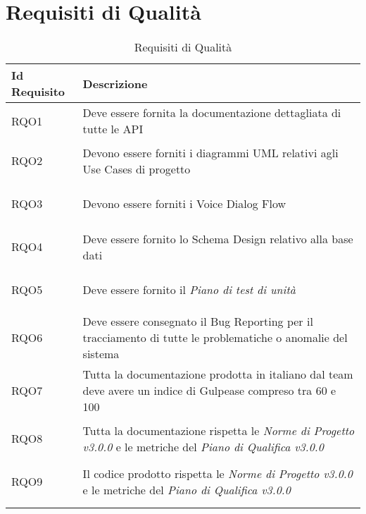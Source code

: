 \section{Requisiti di Qualità}
\normalsize
\begin{longtable}{|>{\centering}m{5em}|m{25em}|}
	\hline
	\textbf{Id Requisito} & \textbf{Descrizione}\\
	\hline
	\endhead
	\hypertarget{RQO1}{RQO1} & Deve essere fornita la documentazione dettagliata di tutte le API\\ \hline
	
	\hypertarget{RQO2}{RQO2} & Devono essere forniti i diagrammi UML relativi agli Use Cases di progetto\\ \hline
	
	\hypertarget{RQO3}{RQO3} & Devono essere forniti i Voice Dialog Flow\\ \hline
	
	\hypertarget{RQO4}{RQO4} & Deve essere fornito lo Schema Design relativo alla base dati\\ \hline
	
	\hypertarget{RQO5}{RQO5} & Deve essere fornito il \textit{Piano di test di unità}\\ \hline
	
	\hypertarget{RQO6}{RQO6} & Deve essere consegnato il Bug Reporting per il tracciamento di tutte le problematiche o anomalie del sistema\\ \hline
	
	\hypertarget{RQO7}{RQO7} & Tutta la documentazione prodotta in italiano dal team deve avere un indice di Gulpease compreso tra 60 e 100\\ \hline
	
	\hypertarget{RQO8}{RQO8} & Tutta la documentazione rispetta le \textit{Norme di Progetto v3.0.0} e le metriche del \textit{Piano di Qualifica v3.0.0}\\ \hline
	
	\hypertarget{RQO9}{RQO9} & Il codice prodotto rispetta le \textit{Norme di Progetto v3.0.0} e le metriche del \textit{Piano di Qualifica v3.0.0}\\ \hline
	
	\caption[Requisiti di Qualità]{Requisiti di Qualità}
	\label{tabella:req2}
\end{longtable}
\clearpage

